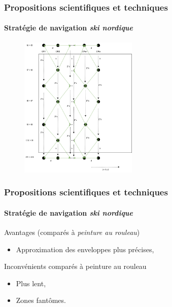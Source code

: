 \documentclass{beamer}
\begin{document}
			\begin{frame}
				\frametitle{Propositions scientifiques et techniques}
				\framesubtitle{Stratégie de navigation \textit{ski nordique}}
				\begin{figure}
					\centering
					\includegraphics[width=0.5\textwidth]{graphics/ski_nordique_2.png}
				\end{figure}
			\end{frame}
			\begin{frame}
				\frametitle{Propositions scientifiques et techniques}
				\framesubtitle{Stratégie de navigation \textit{ski nordique}}
				\begin{exampleblock}{Avantages (comparés à \textit{peinture au rouleau})}
					\begin{itemize}
						\item Approximation des enveloppes plus précises,
					\end{itemize}
				\end{exampleblock}
				\begin{alertblock}{Inconvénients comparés à peinture au rouleau}
					\begin{itemize}
						\item Plus lent,
						\item Zones fantômes.
					\end{itemize}
				\end{alertblock}
			\end{frame}
\end{document}
